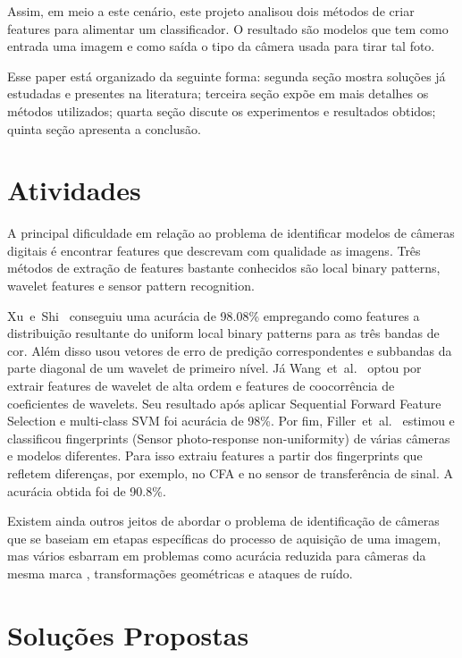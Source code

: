 \documentclass[10pt,twocolumn,letterpaper]{article}
\newcommand{\CITETWO}[3]{\mbox{#1 e #2 \cite{#3}}}
\newcommand{\CITEN}[2]{\mbox{#1 et al. \cite{#2}}}
\begin{document}
Assim, em meio a este cenário, este projeto analisou dois métodos de criar features para alimentar um classificador. O resultado são modelos que tem como entrada uma imagem e como saída o tipo da câmera usada para tirar tal foto.

Esse paper está organizado da seguinte forma: segunda seção mostra soluções já estudadas e presentes na literatura; terceira seção expõe em mais detalhes os métodos utilizados; quarta seção discute os experimentos e resultados obtidos; quinta seção apresenta a conclusão.

\section{Atividades}

A principal dificuldade em relação ao problema de identificar modelos de câmeras digitais é encontrar features que descrevam com qualidade as imagens. Três métodos de extração de features bastante conhecidos são local binary patterns, wavelet features e sensor pattern recognition.

\CITETWO{Xu}{Shi}{Xu_2012} conseguiu uma acurácia de 98.08\% empregando como features a distribuição resultante do uniform local binary patterns para as três bandas de cor. Além disso usou vetores de erro de predição correspondentes e subbandas da parte diagonal de um wavelet de primeiro nível. Já \CITEN{Wang}{Bo_2009} optou por extrair features de wavelet de alta ordem e features de coocorrência de coeficientes de wavelets. Seu resultado após aplicar Sequential Forward Feature Selection e multi-class SVM foi acurácia de 98\%. Por fim, \CITEN{Filler}{Tomas_2008} estimou e classificou fingerprints (Sensor photo-response non-uniformity) de várias câmeras e modelos diferentes. Para isso extraiu features a partir dos fingerprints que refletem diferenças, por exemplo, no CFA e no sensor de transferência de sinal. A acurácia obtida foi de 90.8\%.

Existem ainda outros jeitos de abordar o problema de identificação de câmeras que se baseiam em etapas específicas do processo de aquisição de uma imagem, mas vários esbarram em problemas como acurácia reduzida para câmeras da mesma marca \cite{Bayram_2005}, transformações geométricas e ataques de ruído.

\section{Soluções Propostas}
\end{document}
